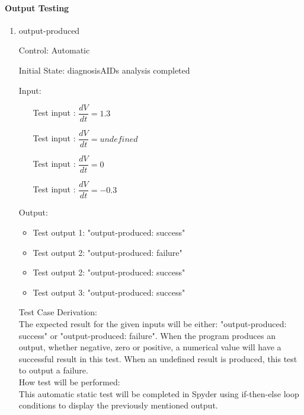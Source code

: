 \documentclass[12pt, titlepage]{article}
\newcounter{tinnum} %
\begin{document}
\begin{enumerate}
\paragraph{Output Testing}

\begin{enumerate}

\item{output-produced\\}

Control: Automatic
					
Initial State: diagnosisAIDs analysis completed 
					
Input:
\begin{itemize}
\item[Test input \refstepcounter{tinnum}\thetinnum\label{Tinput_12}:] 
$\dfrac{dV}{dt} = 1.3$ %
\item[Test input \refstepcounter{tinnum}\thetinnum\label{Tinput_13}:]
$\dfrac{dV}{dt} = undefined$ %
\item[Test input \refstepcounter{tinnum}\thetinnum\label{Tinput_14}:] 
$\dfrac{dV}{dt} = 0$ %
\item[Test input \refstepcounter{tinnum}\thetinnum\label{Tinput_15}:] 
$\dfrac{dV}{dt} = -0.3$

\end{itemize}

Output: 
\begin{itemize}
\item Test output 1: "output-produced: success"
\item Test output 2: "output-produced: failure"
\item Test output 2: "output-produced: success" 
\item Test output 3: "output-produced: success"

\end{itemize}

Test Case Derivation:\\
The expected result for the given inputs will be either: "output-produced: 
success" or  "output-produced: failure". When the program produces an output, 
whether negative, zero or positive, a numerical value will have a successful 
result in this test. When an undefined result is produced, this test to output a 
failure.\\

How test will be performed: \\
This automatic static test will be completed in Spyder using if-then-else loop 
conditions to display the previously mentioned output. \\


\end{enumerate}
\end{enumerate}
\end{document}
